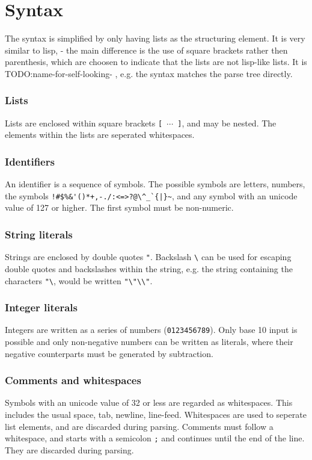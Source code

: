 \section{Syntax}
The syntax is simplified by only having lists as the structuring element.
It is very similar to lisp, - the main difference is the use of square brackets rather then parenthesis, which are choosen to indicate that the lists are not lisp-like lists.
It is TODO:name-for-self-looking- , e.g. the syntax matches the parse tree directly.

\subsubsection{Lists}
Lists are enclosed within square brackets \verb|[ |$\cdots$\verb| ]|, and may be nested. The elements within the lists are seperated whitespaces.

\subsubsection{Identifiers}
An identifier is a sequence of symbols. The possible symbols are letters, numbers, the symbols \verb]!#$%&'()*+,-./:<=>?@\^_`{|}~], and any symbol with an unicode value of 127 or higher. The first symbol must be non-numeric.

\subsubsection{String literals}
Strings are enclosed by double quotes \verb|"|. Backslash \verb|\| can be used for escaping double quotes and backslashes within the string, e.g. the string containing the characters \verb|"\|, would be written \verb|"\"\\"|.

\subsubsection{Integer literals}
Integers are written as a series of numbers (\verb|0123456789|). Only base 10 input is possible and only non-negative numbers can be written as literals, where their negative counterparts must be generated by subtraction.

\subsubsection{Comments and whitespaces}
Symbols with an unicode value of 32 or less are regarded as whitespaces. This includes the usual space, tab, newline, line-feed. Whitespaces are used to seperate list elements, and are discarded during parsing.
Comments must follow a whitespace, and starts with a semicolon \verb|;| and continues until the end of the line. They are discarded during parsing. 

